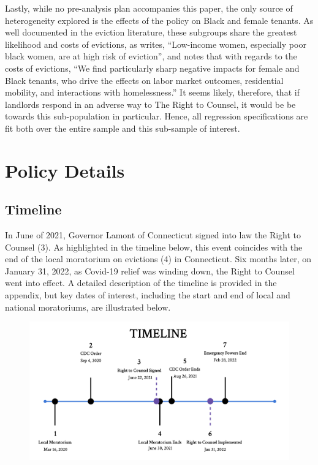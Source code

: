 \documentclass[a4paper,12pt]{article}
\begin{document}
Lastly, while no pre-analysis plan accompanies this paper, the only source of heterogeneity explored is the effects of the policy on Black and female tenants. As well documented in the eviction literature, these subgroups share the greatest likelihood and costs of evictions, as \cite{desmond2019unaffordable} writes, ``Low-income women, especially poor black women, are at high risk of eviction'', and \cite{collinson2022eviction} notes that with regards to the costs of evictions, ``We find particularly sharp negative impacts for female and Black tenants, who drive the effects on labor market outcomes, residential mobility, and interactions with homelessness.'' It seems likely, therefore, that if landlords respond in an adverse way to The Right to Counsel, it would be be towards this sub-population in particular. Hence, all regression specifications are fit both over the entire sample and this sub-sample of interest.

\section{Policy Details}
\subsection{Timeline}
In June of 2021, Governor Lamont of Connecticut signed into law the Right to Counsel (3). As highlighted in the timeline below, this event coincides with the end of the local moratorium on evictions (4) in Connecticut. Six months later, on January 31, 2022, as Covid-19 relief was winding down, the Right to Counsel went into effect. A detailed description of the timeline is provided in the appendix, but key dates of interest, including the start and end of local and national moratoriums, are illustrated below. 
\par 
\begin{figure}[htbp]
\centering
    \centering
    \includegraphics[width=.60\linewidth]{figures/rtc/context/timeline.png}
    \label{SUBFIGURE LABEL 3}
\end{figure}
\end{document}
